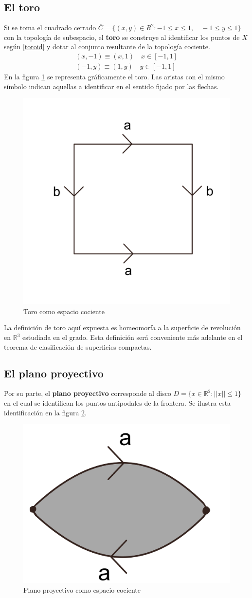 \documentclass[a4paper,11pt,spanish, twoside, leqno]{tfg-uam}
\newcommand*{\reales}{\mathbb{R}}
\theoremstyle{definition}
\begin{document}
\subsection*{El toro}
Si se toma el cuadrado cerrado $ \overline{C} = \{ (x,y) \in R^2: -1\leq x\leq 1,\quad -1\leq y \leq 1  \} $ con la topología de subespacio, el \textbf{toro}  se construye al identificar los puntos de  $ X $ según  \ref{toroid} y dotar al conjunto resultante de la topología cociente.
\begin{align}\label{toroid}
	(x,-1)\equiv(x,1) \quad x\in [-1,1]  \\
	(-1,y)\equiv(1,y) \quad y\in [-1,1] \nonumber
\end{align}
En la figura \ref{fig:toro expresion canonica} se representa gráficamente el toro. Las aristas con el mismo símbolo indican aquellas a identificar en el sentido fijado por las flechas.
\begin{figure}[h!]
	\centering
	\includegraphics[width=0.2\linewidth]{imagenes/toroplano.png}
	\caption{Toro como espacio cociente}
	\label{fig:toro expresion canonica}
\end{figure} 

La definición de toro aquí expuesta es homeomorfa a la superficie de revolución en $\reales^3$ estudiada en el grado. Esta definición será conveniente más adelante en el teorema de clasificación de superficies compactas.

\subsection*{El plano proyectivo}
Por su parte, el \textbf{plano proyectivo} corresponde al disco $ D = \{x\in\mathbb{R}^2: ||x||\leq1 \} $ en el cual se identifican los puntos antipodales de la frontera. Se ilustra esta identificación en la figura \ref{fig:planoproyectivo expresión canónica}.

\begin{figure}[h!]
	\centering
	\includegraphics[width=0.3\linewidth]{imagenes/planop_plano.png}
	\caption{Plano proyectivo como espacio cociente}
	\label{fig:planoproyectivo expresión canónica}
\end{figure} 
\end{document}

